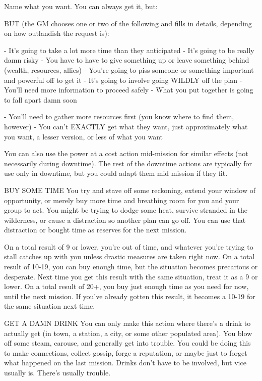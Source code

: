 Name what you want. You can always get it, but:  

BUT (the GM chooses one or two of the following and fills in details, depending on how  
outlandish the request is):
 
    -    It’s going to take a lot more time than they anticipated  
    -    It’s going to be really damn risky  
    -    You have to have to give something up or leave something behind (wealth, resources,  
         allies)  
    -    You’re going to piss someone or something important and powerful off to get it  
    -    It’s going to involve going WILDLY off the plan  
    -    You’ll need more information to proceed safely  
    -    What you put together is going to fall apart damn soon  

                                                                                                                  


    -    You’ll need to gather more resources first (you know where to find them, however)  
    -    You can’t EXACTLY get what they want, just approximately what you want, a lesser  
         version, or less of what you want
 

You can also use the power at a cost action mid-mission for similar effects (not necessarily  
during downtime). The rest of the downtime actions are typically for use only in downtime, but  
you could adapt them mid mission if they fit.
 

BUY SOME TIME  
You try and stave off some reckoning, extend your window of opportunity, or merely buy more  
time and breathing room for you and your group to act. You might be trying to dodge some heat,  
survive stranded in the wilderness, or cause a distraction so another plan can go off. You can use  
that distraction or bought time as reserves for the next mission.  

On a total result of 9 or lower, you’re out of time, and whatever you’re trying to stall catches up  
with you unless drastic measures are taken right now.  
On a total result of 10-19, you can buy enough time, but the situation becomes precarious or  
desperate. Next time you get this result with the same situation, treat it as a 9 or lower.  
On a total result of 20+, you buy just enough time as you need for now, until the next mission. If  
you’ve already gotten this result, it becomes a 10-19 for the same situation next time.  

GET A DAMN DRINK  
You can only make this action where there’s a drink to actually get (in town, a station, a city, or  
some other populated area). You blow off some steam, carouse, and generally get into trouble.  
You could be doing this to make connections, collect gossip, forge a reputation, or maybe just to  
forget what happened on the last mission. Drinks don’t have to be involved, but vice usually is.  
There’s usually trouble.  

